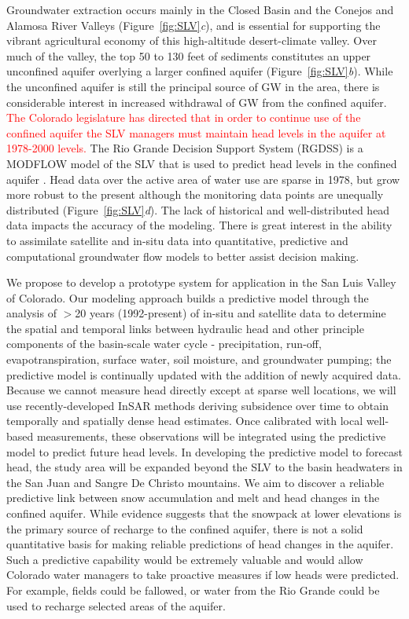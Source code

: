 \documentclass[11pt,final]{article}%
\renewcommand{\citep}{\cite}
\begin{document}
Groundwater extraction occurs mainly in the Closed Basin and the Conejos and Alamosa River Valleys (Figure~\ref{fig:SLV}\emph{c}), and is essential for supporting the vibrant agricultural economy of this high-altitude desert-climate valley. Over much of the valley, the top 50 to 130 feet of sediments constitutes an upper unconfined aquifer overlying a larger confined aquifer (Figure~\ref{fig:SLV}\emph{b}). While the unconfined aquifer is still the principal source of GW in the area, there is considerable interest in increased withdrawal of GW from the confined aquifer.  \textcolor{red}{The Colorado legislature has directed that in order to continue use of the confined aquifer the SLV managers must maintain head levels in the aquifer at 1978-2000 levels.} The Rio Grande Decision Support System (RGDSS) is a MODFLOW model of the SLV that is used to predict head levels in the confined aquifer  \citep{RGDSS}.  Head data over the active area of water use are sparse in 1978, but grow more robust to the present although the monitoring data points are unequally distributed (Figure~\ref{fig:SLV}\emph{d}). The lack of historical and well-distributed head data impacts the accuracy of the modeling.  There is great interest in the ability to assimilate satellite and in-situ data into quantitative, predictive and computational groundwater flow models to better assist decision making.

We propose to develop a prototype system for application in the San Luis Valley of Colorado. Our modeling approach builds a predictive model through the analysis of $>$20 years (1992-present) of in-situ and satellite data to determine the spatial and temporal links between hydraulic head and other principle components of the basin-scale water cycle - precipitation, run-off, evapotranspiration, surface water, soil moisture, and groundwater pumping; the predictive model is continually updated with the addition of newly acquired data. Because we cannot measure head directly except at sparse well locations, we will use recently-developed InSAR methods deriving subsidence over time to obtain temporally and spatially dense head estimates.  Once calibrated with local well-based measurements, these observations will be integrated using the predictive model to predict future head levels. In developing the predictive model to forecast head, the study area will be expanded beyond the SLV to the basin headwaters in the San Juan and Sangre De Christo mountains. We aim to discover a reliable predictive link between snow accumulation and melt and head changes in the confined aquifer.  While evidence suggests that the snowpack at lower elevations is the primary source of recharge to the confined aquifer, there is not a solid quantitative basis for making reliable predictions of head changes in the aquifer.  Such a predictive capability would be extremely valuable and would allow Colorado water managers to take proactive measures if low heads were predicted.  For example, fields could be fallowed, or water from the Rio Grande could be used to recharge selected areas of the aquifer.
\end{document}

